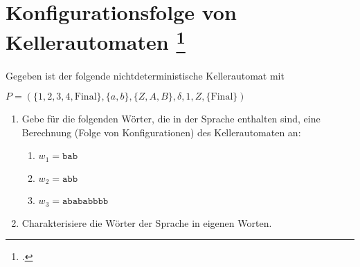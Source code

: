 \documentclass{lehramt-informatik-aufgabe}
\begin{document}
\section{Konfigurationsfolge von Kellerautomaten
\index{}
\footcite{theo:ab:2}}

Gegeben ist der folgende nichtdeterministische Kellerautomat mit

$P = (\{1, 2, 3, 4, \text{Final}\}, \{a, b\}, \{Z, A, B\}, \delta, 1, Z, \{\text{Final}\})$

\begin{enumerate}

\item Gebe für die folgenden Wörter, die in der Sprache enthalten sind,
eine Berechnung (Folge von Konfigurationen) des Kellerautomaten an:

\begin{enumerate}


\item $w_1 = \texttt{bab}$


\item $w_2 = \texttt{abb}$


\item $w_3 = \texttt{abababbbb}$
\end{enumerate}

\item Charakterisiere die Wörter der Sprache in eigenen Worten.

\end{enumerate}
\end{document}
